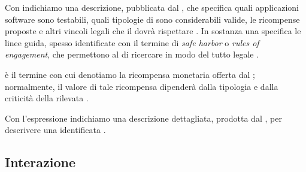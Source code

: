 \begin{definizione}[\BugBounty]
Con \bugbounty indichiamo una descrizione, pubblicata dal \BI, che specifica quali applicazioni software sono testabili, quali tipologie di \vulnerability sono considerabili valide, le ricompense proposte e altri vincoli legali che il \BH dovrà rispettare \cite{hoffman2021bountychain, hoffman2020bountychain}. In sostanza una \bugbounty specifica le linee guida, spesso identificate con il termine di \emph{safe harbor} o \emph{rules of engagement}, che permettono al \BH di ricercare \vulnerability in modo del tutto legale \cite{walshe2022cvdpaper, walshe2020bountypaper, walshe2023bountythesis3}.
\end{definizione}

\begin{definizione}[\BountyReward]
\Bountyreward è il termine con cui denotiamo la ricompensa monetaria offerta dal \BI \cite{hoffman2021bountychain}; normalmente, il valore di tale ricompensa dipenderà dalla tipologia e dalla criticità della \vulnerability rilevata \cite{canidio2021verioss}.
\end{definizione}

\begin{definizione}[\BugReport]
Con l'espressione \bugreport indichiamo una descrizione dettagliata, prodotta dal \BH, per descrivere una \vulnerability identificata \cite{hoffman2021bountychain}.
\end{definizione}

\subsection{Interazione}


